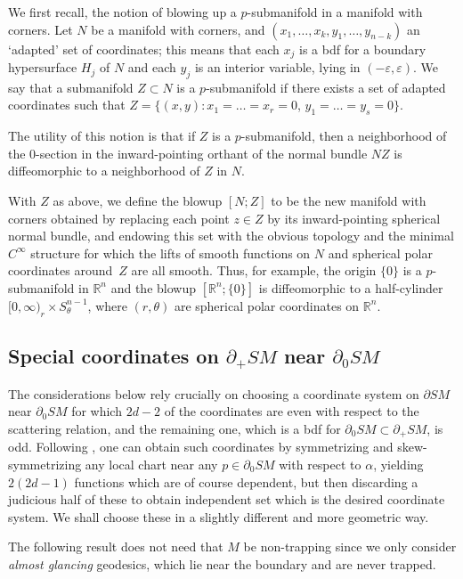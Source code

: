 \documentclass[11pt]{article}
\let\epsilon\varepsilon
\theoremstyle{plain}
\theoremstyle{definition}
\theoremstyle{remark}
\newcommand{\del}{\partial}
\begin{document}
We first recall, the notion of blowing up a $p$\nobreakdash-sub\-manifold in a manifold with corners. Let $N$ be a manifold with corners, and $(x_1, \ldots, x_k, y_1, \ldots, y_{n-k})$ an `adapted' set of coordinates; this means that each $x_j$ is a bdf for a boundary hypersurface $H_j$ of $N$ and each $y_j$ is an interior variable, lying in $(-\epsilon, \epsilon)$. We say that a submanifold $Z \subset N$ is a $p$-submanifold if there exists a set of adapted coordinates such that $Z = \{(x,y): x_1 = \ldots = x_r = 0$, $y_1 = \ldots = y_s = 0\}$.

The utility of this notion is that if $Z$ is a $p$-submanifold, then a neighborhood of the $0$-section in the inward-pointing orthant of the normal bundle $NZ$ is diffeomorphic to a neighborhood of $Z$ in $N$.

With $Z$ as above, we define the blowup $[N;Z]$ to be the new manifold with corners obtained by replacing each point $z \in Z$ by its inward-pointing spherical normal bundle, and endowing this set with the obvious topology and the minimal $C^\infty$ structure for which the lifts of smooth functions on $N$ and spherical polar coordinates around~$Z$ are all smooth. Thus, for example, the origin $\{0\}$ is a $p$-submanifold in $\mathbb R^n$ and the blowup $[\mathbb R^n; \{0\}]$ is diffeomorphic to a half-cylinder $[0,\infty)_r \times S^{n-1}_\theta$, where $(r,\theta)$ are spherical polar coordinates on $\mathbb R^n$.

\subsection{Special coordinates on $\partial_+ SM$ near $\partial_0 SM$} \label{sec:glancingCoords}

The considerations below rely crucially on choosing a coordinate system on $\partial SM$ near $\partial_0 SM$ for which $2d-2$
of the coordinates are even with respect to the scattering relation, and the remaining one, which is a bdf for $\del_0 SM \subset \del_+ SM$, is odd.
Following \cite[Th.\,C.4.5]{Hoermander2007}, one can obtain such coordinates by symmetrizing and skew-symmetrizing
any local chart near any $p\in \partial_0 SM$ with respect to $\alpha$, yielding $2(2d-1)$ functions which are of course dependent,
but then discarding a judicious half of these to obtain independent set which is the desired coordinate system. We shall
choose these in a slightly different and more geometric way.

The following result does not need that $M$ be non-trapping since we only consider {\it almost glancing} geodesics, which
lie near the boundary and are never trapped.
\end{document}
